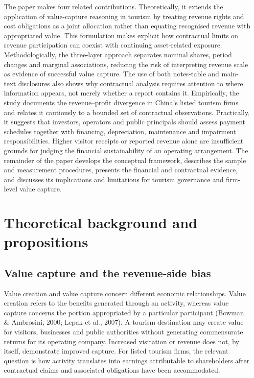 \documentclass[review,3p,times]{elsarticle}
\begin{document}
The paper makes four related contributions. Theoretically, it extends the application of value-capture reasoning in tourism by treating revenue rights and cost obligations as a joint allocation rather than equating recognised revenue with appropriated value. This formulation makes explicit how contractual limits on revenue participation can coexist with continuing asset-related exposure. Methodologically, the three-layer approach separates nominal shares, period changes and marginal associations, reducing the risk of interpreting revenue scale as evidence of successful value capture. The use of both notes-table and main-text disclosures also shows why contractual analysis requires attention to where information appears, not merely whether a report contains it. Empirically, the study documents the revenue--profit divergence in China's listed tourism firms and relates it cautiously to a bounded set of contractual observations. Practically, it suggests that investors, operators and public principals should assess payment schedules together with financing, depreciation, maintenance and impairment responsibilities. Higher visitor receipts or reported revenue alone are insufficient grounds for judging the financial sustainability of an operating arrangement. The remainder of the paper develops the conceptual framework, describes the sample and measurement procedures, presents the financial and contractual evidence, and discusses its implications and limitations for tourism governance and firm-level value capture.

\section{Theoretical background and propositions}

\subsection{Value capture and the revenue-side bias}

Value creation and value capture concern different economic relationships. Value creation refers to the benefits generated through an activity, whereas value capture concerns the portion appropriated by a particular participant (Bowman \& Ambrosini, 2000; Lepak et al., 2007). A tourism destination may create value for visitors, businesses and public authorities without generating commensurate returns for its operating company. Increased visitation or revenue does not, by itself, demonstrate improved capture. For listed tourism firms, the relevant question is how activity translates into earnings attributable to shareholders after contractual claims and associated obligations have been accommodated.
\end{document}
